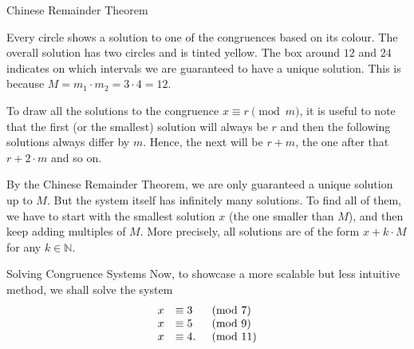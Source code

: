 \documentclass[final]{beamer}
\newlength{\colwidth}
\newcommand{\N}{\mathbb{N}}
\begin{document}
\begin{frame}[t]
\begin{columns}[t]
\begin{column}{\colwidth}
\begin{alertblock}{Chinese Remainder Theorem}
\begin{center}
\end{center}
Every circle shows a solution to one of the congruences based on its colour.
The overall solution has two circles and is tinted yellow. The box around $12$
and $24$ indicates on which intervals we are guaranteed to have a unique
solution. This is because $M = m_1 \cdot m_2 = 3 \cdot 4 = 12$.

To draw all the solutions to the congruence $x \equiv r \pmod{m}$, it is useful
to note that the first (or the smallest) solution will always be $r$ and then
the following solutions always differ by $m$. Hence, the next will be $r+m$, the
one after that $r+2 \cdot m$ and so on.

By the Chinese Remainder Theorem, we are only guaranteed a \alert{unique
solution up to $M$}. But the \alert{system itself has infinitely many
solutions}. To find all of them, we have to start with the smallest solution $x$
(the one smaller than $M$), and then keep adding multiples of $M$. More
precisely, \alert{all solutions are of the form $x + k \cdot M$} for any $k \in
\N$.
\end{alertblock}
 \begin{block}{Solving Congruence Systems}
  Now, to showcase a more scalable but less intuitive method, we shall solve the system
  \[
   \begin{array}{r l l}
    x & \equiv 3  &\pmod{7}\\
    x & \equiv 5  &\pmod{9}\\
    x & \equiv 4. &\pmod{11}
   \end{array}
  \]
  

\end{block}
\end{column}
\end{columns}
\end{frame}
\end{document}
